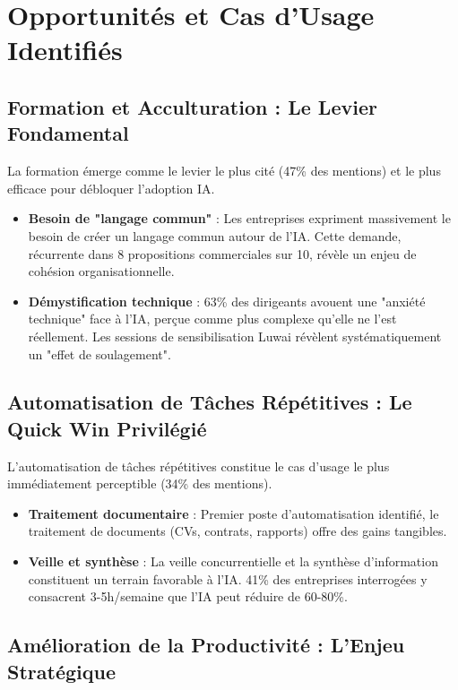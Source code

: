 \section{Opportunités et Cas d'Usage Identifiés}

\subsection{Formation et Acculturation : Le Levier Fondamental}

La formation émerge comme le levier le plus cité (47\% des mentions) et le plus efficace pour débloquer l'adoption IA.

\begin{itemize}
    \item \textbf{Besoin de "langage commun"} : Les entreprises expriment massivement le besoin de créer un langage commun autour de l'IA. Cette demande, récurrente dans 8 propositions commerciales sur 10, révèle un enjeu de cohésion organisationnelle.
    \item \textbf{Démystification technique} : 63\% des dirigeants avouent une "anxiété technique" face à l'IA, perçue comme plus complexe qu'elle ne l'est réellement. Les sessions de sensibilisation Luwai révèlent systématiquement un "effet de soulagement".
\end{itemize}

\subsection{Automatisation de Tâches Répétitives : Le Quick Win Privilégié}

L'automatisation de tâches répétitives constitue le cas d'usage le plus immédiatement perceptible (34\% des mentions).

\begin{itemize}
    \item \textbf{Traitement documentaire} : Premier poste d'automatisation identifié, le traitement de documents (CVs, contrats, rapports) offre des gains tangibles.
    \item \textbf{Veille et synthèse} : La veille concurrentielle et la synthèse d'information constituent un terrain favorable à l'IA. 41\% des entreprises interrogées y consacrent 3-5h/semaine que l'IA peut réduire de 60-80\%.
\end{itemize}

\subsection{Amélioration de la Productivité : L'Enjeu Stratégique}

